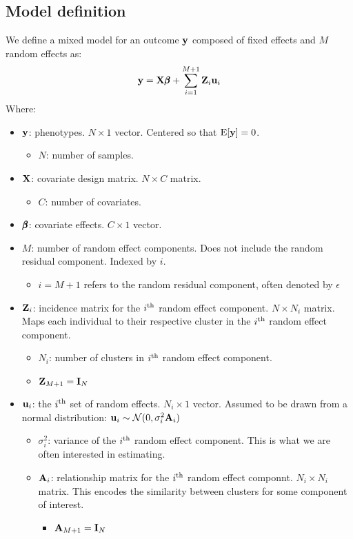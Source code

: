 \documentclass[12pt]{article}
\begin{document}
\subsection{Model definition}
We define a mixed model for an outcome $\mathbf{y}$ composed of fixed effects and $M$ random effects as:
$$ \mathbf{y} = \mathbf{X} \pmb{\beta} + \sum_{i=1}^{M+1} \mathbf{Z}_i \mathbf{u}_i $$
Where:
\begin{itemize}
    \item $\mathbf{y}$: phenotypes.
    $N \times 1$ vector.
    Centered so that $\mathrm{E}[\mathbf{y}]=0$.
    \begin{itemize}
        \item $N$: number of samples.
    \end{itemize}
    \item $\mathbf{X}$: covariate design matrix.
    $N \times C$ matrix.
    \begin{itemize}
        \item $C$: number of covariates.
    \end{itemize}
    \item $\pmb{\beta}$: covariate effects.
    $C \times 1$ vector.
    \item $M$: number of random effect components.
    Does not include the random residual component.
    Indexed by $i$.
    \begin{itemize}
        \item $i = M+1$ refers to the random residual component, often denoted by $\epsilon$
    \end{itemize}
    \item $\mathbf{Z}_i$: incidence matrix for the $i \textsuperscript{th}$ random effect component.
    $N \times N_i$ matrix.
    Maps each individual to their respective cluster in the $i \textsuperscript{th}$ random effect component.
    \begin{itemize}
        \item $N_i$: number of clusters in $i \textsuperscript{th}$ random effect component.
        \item $\mathbf{Z}_{M+1} = \mathbf{I}_{N}$
    \end{itemize}
    \item $\mathbf{u}_i$: the $i \textsuperscript{th}$ set of random effects.
    $N_i \times 1$ vector. Assumed to be drawn from a normal distribution:
    $\mathbf{u}_i \sim \mathcal{N}(0, \sigma^2_i \mathbf{A}_i)$
    \begin{itemize}
        \item $\sigma^2_i$: variance of the $i \textsuperscript{th}$ random effect component.
        This is what we are often interested in estimating.
        \item $\mathbf{A}_i$: relationship matrix for the $i \textsuperscript{th}$ random effect componnt.
        $N_i \times N_i$ matrix.
        This encodes the similarity between clusters for some component of interest.
        \begin{itemize}
            \item $\mathbf{A}_{M+1} = \mathbf{I}_N$
        \end{itemize}
    \end{itemize}
\end{itemize}
\end{document}
